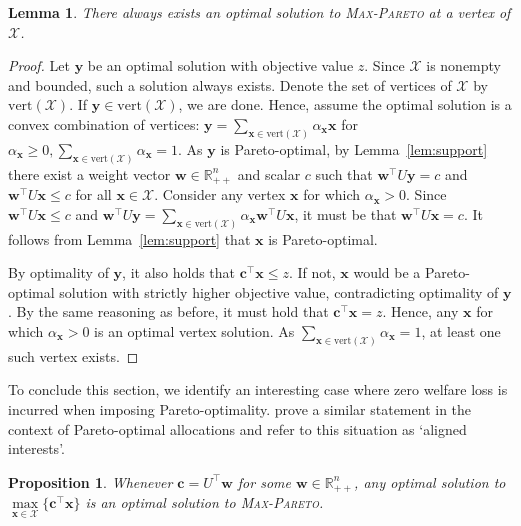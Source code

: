 \documentclass[a4paper, 11pt]{article}
\newtheorem{prop}[thm]{Proposition}
\newtheorem{lem}[thm]{Lemma}
\newcommand{\mc}{\mathcal}
\begin{document}
\begin{lem}
\label{lem:opt_vertex}
There always exists an optimal solution to \textsc{Max-Pareto} at a vertex of $\mc{X}$. 
\end{lem}

\begin{proof}
Let $\bm{y}$ be an optimal solution with objective value $z$. Since $\mathcal{X}$ is nonempty and bounded, such a solution always exists. Denote the set of vertices of $\mc{X}$ by $\text{vert}(\mc{X})$. If $\bm{y} \in \text{vert}(\mc{X})$, we are done. Hence, assume the optimal solution is a convex combination of vertices: $\bm{y} = \sum\limits_{\bm{x} \in \text{vert}(\mc{X})} \alpha_{\bm{x}} \bm{x}$ for $\alpha_{\bm{x}} \geq 0, \sum\limits_{\bm{x} \in \text{vert}(\mc{X})} \alpha_{\bm{x}} = 1$. As $\bm{y}$ is Pareto-optimal, by Lemma~\ref{lem:support} there exist a weight vector $\bm{w}\in\mathbb{R}^n_{++}$ and scalar $c$ such that $\bm{w}^\top U \bm{y} = c$ and $\bm{w}^\top U \bm{x} \leq c$ for all $\bm{x} \in \mc{X}$. Consider any vertex $\bm{x}$ for which $\alpha_{\bm{x}} > 0$. Since $\bm{w}^\top U \bm{x} \leq c$ and $\bm{w}^\top U\bm{y} = \sum\limits_{\bm{x} \in \text{vert}(\mc{X})} \alpha_{\bm{x}} \bm{w}^\top U\bm{x}$, it must be that $\bm{w}^\top U \bm{x} = c$. It follows from Lemma~\ref{lem:support} that $\bm{x}$ is Pareto-optimal. 

By optimality of $\bm{y}$, it also holds that $\bm{c}^\top \bm{x} \leq z$. If not, $\bm{x}$ would be a Pareto-optimal solution with strictly higher objective value, contradicting optimality of $\bm{y}$. By the same reasoning as before, it must hold that $\bm{c}^\top \bm{x} = z$. Hence, any $\bm{x}$ for which $\alpha_{\bm{x}} > 0$ is an optimal vertex solution. As $\sum\limits_{\bm{x} \in \text{vert}(\mc{X})} \alpha_{\bm{x}} = 1$, at least one such vertex exists.
\end{proof}

To conclude this section, we identify an interesting case where zero welfare loss is incurred when imposing Pareto-optimality. \citet{biro2021complexity} prove a similar statement in the context of Pareto-optimal allocations and refer to this situation as `aligned interests'. 
\begin{prop}
\label{prop:zero_loss}
Whenever $\bm{c} = U^\top \bm{w}$ for some $\bm{w} \in \mathbb{R}^{n}_{++}$, any optimal solution to $\max\limits_{\bm{x} \in \mc{X}} \{ \bm{c}^\top \bm{x}\}$ is an optimal solution to \textsc{Max-Pareto}.
\end{prop}
\end{document}

